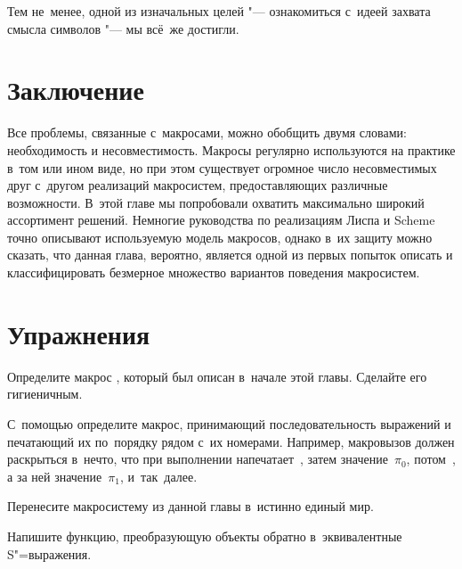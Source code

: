 Тем не~менее, одной из изначальных целей "--- ознакомиться с~идеей захвата
смысла символов "--- мы всё~же достигли.


\section{Заключение}\label{macros/sect:conclusions}

Все проблемы, связанные с~макросами, можно обобщить двумя словами: необходимость
и несовместимость. Макросы регулярно используются на практике в~том или ином
виде, но при этом существует огромное число несовместимых друг с~другом
реализаций макросистем, предоставляющих различные возможности. В~этой главе
мы попробовали охватить максимально широкий ассортимент решений. Немногие
руководства по реализациям Лиспа и Scheme точно описывают используемую модель
макросов, однако в~их защиту можно сказать, что данная глава, вероятно, является
одной из первых попыток описать и классифицировать безмерное множество вариантов
поведения макросистем.


\section{Упражнения}\label{macros/sect:exercises}

\begin{exercise}\label{macros/ex:repeat}
Определите макрос , который был описан в~начале этой главы. Сделайте
его гигиеничным.
\end{exercise}

\begin{exercise}\label{macros/ex:arg-sequence}
С~помощью  определите макрос, принимающий последовательность
выражений и печатающий их по~порядку рядом с~их номерами. Например, макровызов
 должен раскрыться в~нечто, что при
выполнении напечатает~, затем значение~$\pi_0$, потом~, а за ней
значение~$\pi_1$, и~так~далее.
\end{exercise}

\begin{exercise}\label{macros/ex:unique}
Перенесите макросистему из данной главы в~истинно единый мир.
\end{exercise}

\begin{exercise}\label{macros/ex:decompile}
Напишите функцию, преобразующую объекты  обратно в~эквивалентные
S"=выражения.
\end{exercise}

